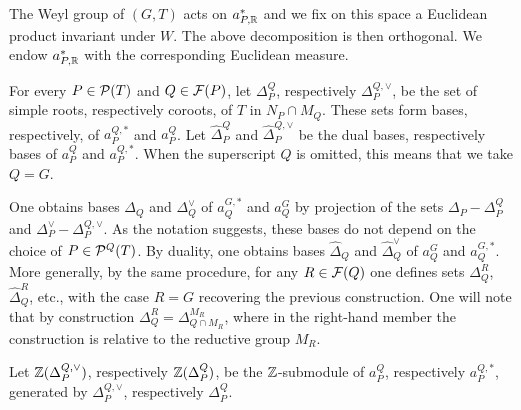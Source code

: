 \begin{paragr}[Notations.]
The Weyl group of $(G,T)$ acts on $a_{P,\mathbb{R}}^{*}$ and we fix on this space a Euclidean product invariant under $W$. The above decomposition is then orthogonal. We endow $ a_{P,\mathbb{R}}^{*}$ with the corresponding Euclidean measure.

For every $P\in \mathcal{P}(T)$ and $Q\in \mathcal{F}(P)$, let $\Delta_P^Q$, respectively $\Delta_P^{Q,\vee}$, be the set of simple roots, respectively coroots, of $T$ in $N_P\cap M_Q$. These sets form bases, respectively, of $a_P^{Q,*}$ and $a_P^Q$. Let $\hat{\Delta}_P^Q$ and $\hat{\Delta}_P^{Q,\vee}$ be the dual bases, respectively bases of $a_P^Q$ and $a_P^{Q,*}$. When the superscript $Q$ is omitted, this means that we take $Q=G$.

One obtains bases $\Delta_Q$ and $\Delta_Q^\vee$ of $a_Q^{G,*}$ and $a_Q^G$ by projection of the sets $\Delta_P-\Delta_P^Q$ and $\Delta_P^\vee-\Delta_P^{Q,\vee}$. As the notation suggests, these bases do not depend on the choice of $P\in \mathcal{P}^Q(T)$. By duality, one obtains bases $\hat{\Delta}_Q$ and $\hat{\Delta}_Q^\vee$ of $a_Q^G$ and $a_Q^{G,*}$. More generally, by the same procedure, for any $R\in \mathcal{F}(Q)$ one defines sets $\Delta_Q^R$, $\hat{\Delta}_Q^R$, etc., with the case $R=G$ recovering the previous construction. One will note that by construction $\Delta_Q^R=\Delta_{Q\cap M_R}^{M_R}$, where in the right-hand member the construction is relative to the reductive group $M_R$.

Let $\mathbb{Z}(\Delta_P^{Q,\vee})$, respectively $\mathbb{Z}(\Delta_P^{Q})$, be the $\mathbb{Z}$-submodule of $a_P^{Q}$, respectively $a_P^{Q,*}$, generated by $\Delta_P^{Q,\vee}$, respectively $\Delta_P^{Q}$.
\end{paragr}

